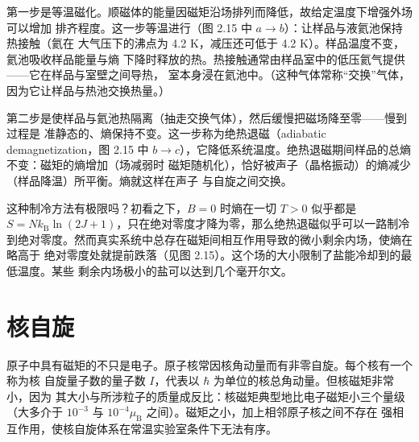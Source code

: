 第一步是等温磁化。顺磁体的能量因磁矩沿场排列而降低，故给定温度下增强外场可以增加
排齐程度。这一步等温进行（图 2.15 中 $a\to b$）：让样品与液氦池保持热接触（氦在
大气压下的沸点为 4.2 K，减压还可低于 4.2 K）。样品温度不变，氦池吸收样品能量与熵
下降时释放的热。热接触通常由样品室中的低压氦气提供——它在样品与室壁之间导热，
室本身浸在氦池中。（这种气体常称“交换”气体，因为它让样品与热池交换热量。）

第二步是使样品与氦池热隔离（抽走交换气体），然后缓慢把磁场降至零——慢到过程是
准静态的、熵保持不变。这一步称为绝热退磁（adiabatic demagnetization，图 2.15 中
$b\to c$），它降低系统温度。绝热退磁期间样品的总熵不变：磁矩的熵增加（场减弱时
磁矩随机化），恰好被声子（晶格振动）的熵减少（样品降温）所平衡。熵就这样在声子
与自旋之间交换。

这种制冷方法有极限吗？初看之下，$B=0$ 时熵在一切 $T>0$ 似乎都是
$S=Nk_{\mathrm{B}}\ln(2J+1)$，只在绝对零度才降为零，那么绝热退磁似乎可以一路制冷
到绝对零度。然而真实系统中总存在磁矩间相互作用导致的微小剩余内场，使熵在略高于
绝对零度处就提前跌落（见图 2.15）。这个场的大小限制了盐能冷却到的最低温度。某些
剩余内场极小的盐可以达到几个毫开尔文。

\section{核自旋}

原子中具有磁矩的不只是电子。原子核常因核角动量而有非零自旋。每个核有一个称为核
自旋量子数的量子数 $I$，代表以 $\hbar$ 为单位的核总角动量。但核磁矩非常小，因为
其大小与所涉粒子的质量成反比：核磁矩典型地比电子磁矩小三个量级（大多介于
$10^{-3}$ 与 $10^{-4}\mu_{\mathrm{B}}$ 之间）。磁矩之小，加上相邻原子核之间不存在
强相互作用，使核自旋体系在常温实验室条件下无法有序。

